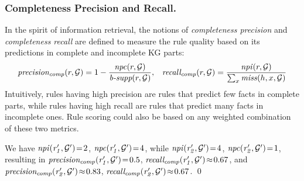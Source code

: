 \subsubsection{Completeness Precision and Recall.} In the spirit of information retrieval, the notions of \emph{completeness precision} and \emph{completeness recall} are defined to measure the rule quality based on its predictions in complete and incomplete KG parts:
\begin{align*}
\mathit{precision_{comp}}(r,\mathcal{G})=1-\frac{\mathit{npc}(r,\mathcal{G})}{\textit{b-supp}(r,\mathcal{G})},\;\;\;
\mathit{recall_{comp}}(r,\mathcal{G})=\frac{\mathit{npi}(r,\mathcal{G})}{\sum_x \mathit{miss}(h,x,\mathcal{G})}
\end{align*}
Intuitively, rules having high precision are rules that predict few facts in complete parts, while rules having high recall are rules that predict many facts in incomplete ones. Rule scoring could also be based on any weighted combination of these two metrics.
\begin{example}
We have $\mathit{npi(r_1', \mathcal{G}')}\!=\!2$, $\mathit{npc(r_1', \mathcal{G}')}\!=\!4$, while $\mathit{npi(r_2',\mathcal{G}')}\!=\!4$, $\mathit{npc(r_2',\mathcal{G}')}\!=\!1$, resulting in $\mathit{precision_{comp}(r_1',\mathcal{G}')}\!=\!0.5$, $\mathit{recall_{comp}(r_1',\mathcal{G}')}\!\approx\!0.67$, and $\mathit{precision_{comp}(r_2',\mathcal{G}')}\!\approx\!0.83$, $\mathit{recall_{comp}(r_2',\mathcal{G}')}\!\approx\!0.67$.
\qed
\end{example}

